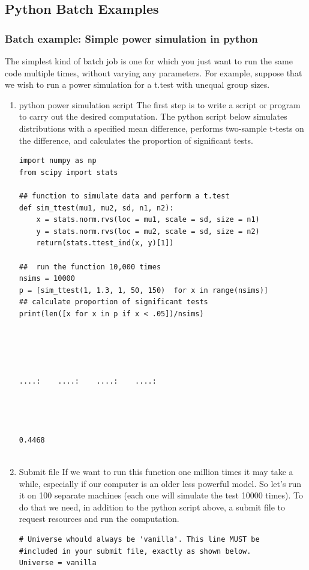 \documentclass[11pt]{article}
\begin{document}
\subsection{Python Batch Examples}
\label{sec:org3a9fd7d}
\subsubsection{Batch example: Simple power simulation in python}
\label{sec:org3bd8b19}
The simplest kind of batch job is one for which you just want to run the same code multiple times, without varying any parameters. For example, suppose that we wish to run a power simulation for a t.test with unequal group sizes. 

\begin{enumerate}
\item python power simulation script
\label{sec:org6274055}
The first step is to write a script or program to carry out the desired computation. The python script below simulates distributions with a specified mean difference, performs two-sample t-tests on the difference, and calculates the proportion of significant tests.
\begin{verbatim}
import numpy as np
from scipy import stats

## function to simulate data and perform a t.test
def sim_ttest(mu1, mu2, sd, n1, n2):
    x = stats.norm.rvs(loc = mu1, scale = sd, size = n1)
    y = stats.norm.rvs(loc = mu2, scale = sd, size = n2)
    return(stats.ttest_ind(x, y)[1])

##  run the function 10,000 times
nsims = 10000
p = [sim_ttest(1, 1.3, 1, 50, 150)  for x in range(nsims)]
## calculate proportion of significant tests
print(len([x for x in p if x < .05])/nsims)
\end{verbatim}

\begin{verbatim}




....:    ....:    ....:    ....:




0.4468


\end{verbatim}

\item Submit file
\label{sec:org9376759}
If we want to run this function one million times it may take a while, especially if our computer is an older less powerful model. So let's run it on 100 separate machines (each one will simulate the test 10000 times). To do that we need, in addition to the python script above, a submit file to request resources and run the computation.  
\begin{verbatim}
# Universe whould always be 'vanilla'. This line MUST be 
#included in your submit file, exactly as shown below.
Universe = vanilla


\end{verbatim}
\end{enumerate}
\end{document}
